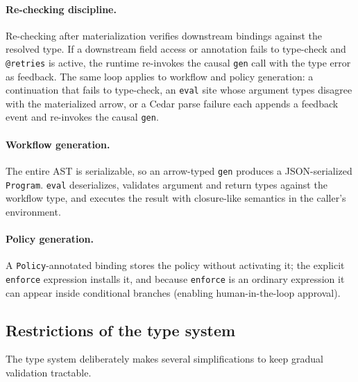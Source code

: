 \paragraph{Re-checking discipline.} Re-checking after materialization verifies
downstream bindings against the resolved type. If a downstream field access or
annotation fails to type-check and \texttt{@retries} is active, the runtime
re-invokes the causal \texttt{gen} call with the type error as feedback. The
same loop applies to workflow and policy generation: a continuation that fails
to type-check, an \texttt{eval} site whose argument types disagree with the
materialized arrow, or a Cedar parse failure each appends a feedback event and
re-invokes the causal \texttt{gen}.

\paragraph{Workflow generation.} The entire \pact{} AST is serializable, so an
arrow-typed \texttt{gen} produces a JSON-serialized \texttt{Program}.
\texttt{eval} deserializes, validates argument and return types against the
workflow type, and executes the result with closure-like semantics in the
caller's environment.

\paragraph{Policy generation.} A \texttt{Policy}-annotated binding stores the
policy without activating it; the explicit \texttt{enforce} expression installs
it, and because \texttt{enforce} is an ordinary expression it can appear inside
conditional branches (enabling human-in-the-loop approval).

\subsection{Restrictions of the type system}

The type system deliberately makes several simplifications to keep gradual
validation tractable.

